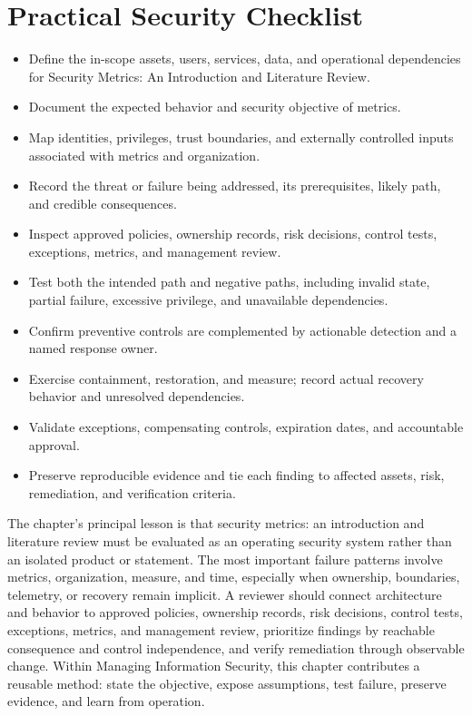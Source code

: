 \documentclass[11pt]{article}
\begin{document}
\section*{Practical Security Checklist}
\begin{itemize}[label=$\square$]
\item Define the in-scope assets, users, services, data, and operational dependencies for Security Metrics: An Introduction and Literature Review.
\item Document the expected behavior and security objective of metrics.
\item Map identities, privileges, trust boundaries, and externally controlled inputs associated with metrics and organization.
\item Record the threat or failure being addressed, its prerequisites, likely path, and credible consequences.
\item Inspect approved policies, ownership records, risk decisions, control tests, exceptions, metrics, and management review.
\item Test both the intended path and negative paths, including invalid state, partial failure, excessive privilege, and unavailable dependencies.
\item Confirm preventive controls are complemented by actionable detection and a named response owner.
\item Exercise containment, restoration, and measure; record actual recovery behavior and unresolved dependencies.
\item Validate exceptions, compensating controls, expiration dates, and accountable approval.
\item Preserve reproducible evidence and tie each finding to affected assets, risk, remediation, and verification criteria.
\end{itemize}
\begin{synthesisbox}
The chapter's principal lesson is that security metrics: an introduction and literature review must be evaluated as an operating security system rather than an isolated product or statement. The most important failure patterns involve metrics, organization, measure, and time, especially when ownership, boundaries, telemetry, or recovery remain implicit. A reviewer should connect architecture and behavior to approved policies, ownership records, risk decisions, control tests, exceptions, metrics, and management review, prioritize findings by reachable consequence and control independence, and verify remediation through observable change. Within Managing Information Security, this chapter contributes a reusable method: state the objective, expose assumptions, test failure, preserve evidence, and learn from operation.
\end{synthesisbox}
\end{document}
